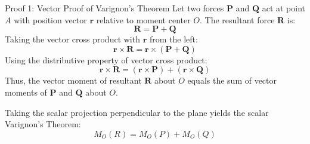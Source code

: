 \documentclass[11pt,a4paper]{article}
\begin{document}
\begin{center}
\end{center}

\begin{proofbox}{Proof 1: Vector Proof of Varignon's Theorem}
Let two forces $\mathbf{P}$ and $\mathbf{Q}$ act at point $A$ with position vector $\mathbf{r}$ relative to moment center $O$.
The resultant force $\mathbf{R}$ is:
\[
\mathbf{R} = \mathbf{P} + \mathbf{Q}
\]
Taking the vector cross product with $\mathbf{r}$ from the left:
\[
\mathbf{r} \times \mathbf{R} = \mathbf{r} \times (\mathbf{P} + \mathbf{Q})
\]
Using the distributive property of vector cross product:
\begin{equation}
\mathbf{r} \times \mathbf{R} = (\mathbf{r} \times \mathbf{P}) + (\mathbf{r} \times \mathbf{Q})
\end{equation}
Thus, the vector moment of resultant $\mathbf{R}$ about $O$ equals the sum of vector moments of $\mathbf{P}$ and $\mathbf{Q}$ about $O$.

Taking the scalar projection perpendicular to the plane yields the scalar Varignon's Theorem:
\begin{equation}
M_O(R) = M_O(P) + M_O(Q)
\end{equation}
\end{proofbox}
\end{document}
